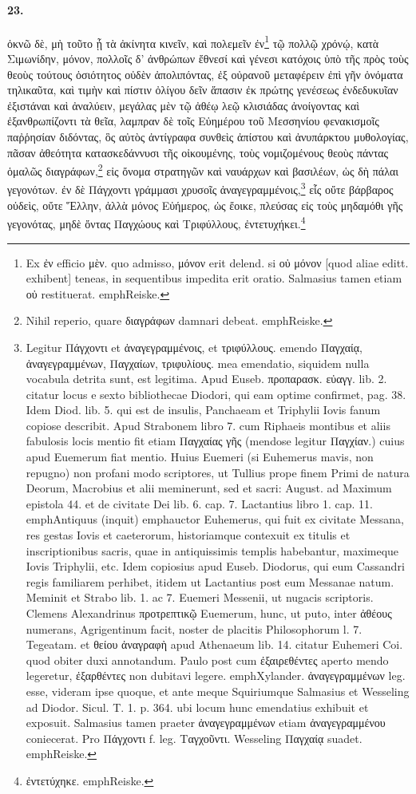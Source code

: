 \documentclass[a4paper, 11pt, oneside, polutonikogreek, german]{article}
\begin{document}
\paragraph{23.}
ὀκνῶ δὲ, μὴ τοῦτο ᾖ τὰ ἀκίνητα κινεῖν, καὶ πολεμεῖν ἐν\footnote{Ex ἐν efficio μὲν. quo admisso, μόνον erit delend. si οὐ μόνον [quod aliae editt. exhibent] teneas, in sequentibus impedita erit oratio. Salmasius tamen etiam οὐ restituerat. emph{Reiske.}} τῷ πολλῷ χρόνῴ, κατὰ Σιμωνίδην, μόνον, πολλοῖς δ' ἀνθρώπων ἔθνεσί καὶ γένεσι κατόχοις ὑπὸ τῆς πρὸς τοὺς θεοὺς τούτους ὁσιότητος οὐδὲν ἀπολιπόντας, ἐξ οὐρανοῦ μεταφέρειν ἐπὶ γῆν ὀνόματα τηλικαῦτα, καὶ τιμὴν καὶ πίστιν ὀλίγου δεῖν ἅπασιν ἐκ πρώτης γενέσεως ἐνδεδυκυῖαν ἐξιστάναι καὶ ἀναλύειν, μεγάλας μὲν τῷ ἀθέῳ λεῷ κλισιάδας ἀνοίγοντας καὶ ἐξανθρωπίζοντι τὰ θεῖα, λαμπραν δὲ τοῖς Εὐημέρου τοῦ Μεσσηνίου φενακισμοῖς παῤῥησίαν διδόντας, ὃς αὐτὸς ἀντίγραφα συνθεὶς ἀπίστου καὶ ἀνυπάρκτου μυθολογίας, πᾶσαν ἀθεότητα κατασκεδάννυσι τῆς οἰκουμένης, τοὺς νομιζομένους θεοὺς πάντας ὁμαλῶς διαγράφων,\footnote{Nihil reperio, quare διαγράφων damnari debeat. emph{Reiske.}} εἰς ὄνομα στρατηγῶν καὶ ναυάρχων καὶ βασιλέων, ὡς δὴ πάλαι γεγονότων. ἐν δὲ Πάγχοντι γράμμασι χρυσοῖς ἀναγεγραμμένοις,\footnote{Legitur Πάγχοντι et ἀναγεγραμμένοις, et τριφύλλους. emendo Παγχαίᾳ, ἀναγεγραμμένων, Παγχαίων, τριφυλίους. mea emendatio, siquidem nulla vocabula detrita sunt, est legitima. Apud Euseb. προπαρασκ. εὐαγγ. lib. 2. citatur locus e sexto bibliothecae Diodori, qui eam optime confirmet, pag. 38. Idem Diod. lib. 5. qui est de insulis, Panchaeam et Triphylii Iovis fanum copiose describit. Apud Strabonem libro 7. cum Riphaeis montibus et aliis fabulosis locis mentio fit etiam Παγχαίας γῆς (mendose legitur Παγχίαν.) cuius apud Euemerum fiat mentio. Huius Euemeri (si Euhemerus mavis, non repugno) non profani modo scriptores, ut Tullius prope finem Primi de natura Deorum, Macrobius et alii meminerunt, sed et sacri: August. ad Maximum epistola 44. et de civitate Dei lib. 6. cap. 7. Lactantius libro 1. cap. 11. emph{Antiquus} (inquit) emph{auctor Euhemerus, qui fuit ex civitate Messana, res gestas Iovis et caeterorum, historiamque contexuit ex titulis et inscriptionibus sacris, quae in antiquissimis templis habebantur, maximeque Iovis Triphylii}, etc. Idem copiosius apud Euseb. Diodorus, qui eum Cassandri regis familiarem perhibet, itidem ut Lactantius post eum Messanae natum. Meminit et Strabo lib. 1. ac 7. Euemeri Messenii, ut nugacis scriptoris. Clemens Alexandrinus προτρεπτικῷ Euemerum, hunc, ut puto, inter ἀθέους numerans, Agrigentinum facit, noster de placitis Philosophorum l. 7. Tegeatam. et θείου ἀναγραφὴ apud Athenaeum lib. 14. citatur Euhemeri Coi. quod obiter duxi annotandum. Paulo post cum ἐξαιρεθέντες aperto mendo legeretur, ἐξαρθέντες non dubitavi legere. emph{Xylander.} ἀναγεγραμμένων leg. esse, videram ipse quoque, et ante meque Squiriumque Salmasius et Wesseling ad Diodor. Sicul. T. 1. p. 364. ubi locum hunc emendatius exhibuit et exposuit. Salmasius tamen praeter ἀναγεγραμμένων etiam ἀναγεγραμμένου coniecerat. Pro Πάγχοντι f. leg. Ταγχοῦντι. Wesseling Παγχαίᾳ suadet. emph{Reiske.}} εἷς οὔτε βάρβαρος οὐδεὶς, οὔτε Ἕλλην, ἀλλὰ μόνος Εὐήμερος, ὡς ἔοικε, πλεύσας εἰς τοὺς μηδαμόθι γῆς γεγονότας, μηδὲ ὄντας Παγχώους καὶ Τριφύλλους, ἐντετυχήκει.\footnote{ἐντετύχηκε. emph{Reiske.}}
\end{document}
